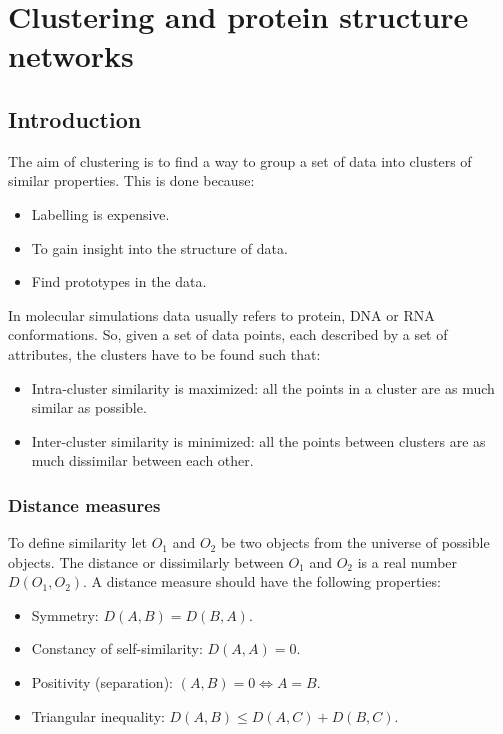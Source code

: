 \graphicspath{{chapters/16/images}}
\chapter{Clustering and protein structure networks}

\section{Introduction}
The aim of clustering is to find a way to group a set of data into clusters of similar properties.
This is done because:

\begin{multicols}{2}
	\begin{itemize}
		\item Labelling is expensive.
		\item To gain insight into the structure of data.
		\item Find prototypes in the data.
	\end{itemize}
\end{multicols}

In molecular simulations data usually refers to protein, DNA or RNA conformations.
So, given a set of data points, each described by a set of attributes, the clusters have to be found such that:

\begin{multicols}{2}
	\begin{itemize}
		\item Intra-cluster similarity is maximized: all the points in a cluster are as much similar as possible.
		\item Inter-cluster similarity is minimized: all the points between clusters are as much dissimilar between each other.
	\end{itemize}
\end{multicols}

	\subsection{Distance measures}
	To define similarity let $O_1$ and $O_2$ be two objects from the universe of possible objects.
	The distance or dissimilarly between $O_1$ and $O_2$ is a real number $D(O_1, O_2)$.
	A distance measure should have the following properties:

	\begin{itemize}
		\item Symmetry: $D(A,B) = D(B, A)$.
		\item Constancy of self-similarity: $D(A, A) = 0$.
		\item Positivity (separation): $(A, B) = 0\Leftrightarrow A=B$.
		\item Triangular inequality: $D(A, B) \le D(A, C) + D(B, C)$.
	\end{itemize}

